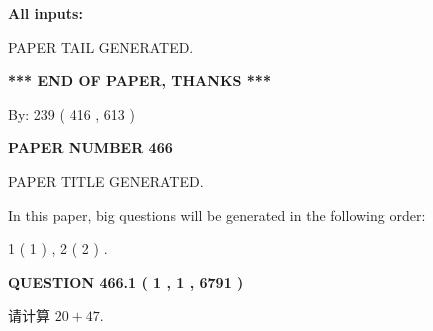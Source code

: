 \documentclass{ctexart}
\begin{document}
   
   
   
\noindent\vspace{0.1in}\hspace{-0.08in} {\textbf{\Large{All inputs: }}}
   
   
   
   
   
   
 \vspace{0.2in}
 
   
   
\vspace{2.0in} PAPER TAIL GENERATED.
   
   
   
   
\vspace{1.0in} 
{\textbf{\large{ *** END OF PAPER, THANKS *** }}} 
   
   
\hspace{1.0in} By: 
 239 ( 416 ,  613 )
   
   
   
   
\newpage 
\setcounter{page}{ 
   466001 } 
   
   
   
   
 {\textbf{ \Large{ PAPER NUMBER  466  }}}
   
   
\vspace{0.2in}
   
   
   
   
   
   
   
   
 \vspace{0.2in}
 
 
 
 
   
   
 PAPER TITLE GENERATED.
   
   
   
\vspace{0.2in}
   
In this paper, big questions will be generated in the following order: 
   
   
   1 ( 1 )
 ,
   2 ( 2 )
 .
  
\vspace{0.2in}
  
{\textbf{\Large{QUESTION
466.1 
 ( 1 , 1 , 6791 )
}}}
  
  
 
请计算 $ %
20 +  %
47 $.
 
 
 
\noindent{}
 
\end{document}

